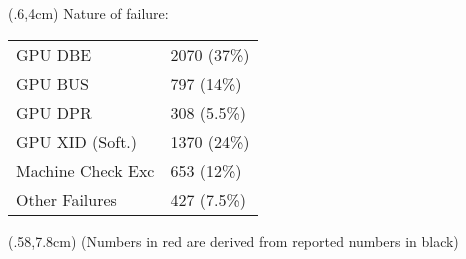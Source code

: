 {  \begin{textblock*}{.45\linewidth}(.6\linewidth,4cm)
    Nature of failure:
    \begin{tabular}{ll}
      GPU DBE & 2070 (37\%)\\
      GPU BUS & 797 (14\%)\\
      GPU DPR & 308 (5.5\%)\\
      GPU XID (Soft.) & 1370 (24\%)\\
      Machine Check Exc & 653 (12\%)\\
      Other Failures & 427 (7.5\%)
    \end{tabular}
  \end{textblock*}

  \begin{textblock*}{.6\textwidth}(.58\textwidth,7.8cm)
    \scriptsize \textcolor{red!40}{(Numbers in red are derived from reported numbers in black)}
  \end{textblock*}

% 
}


